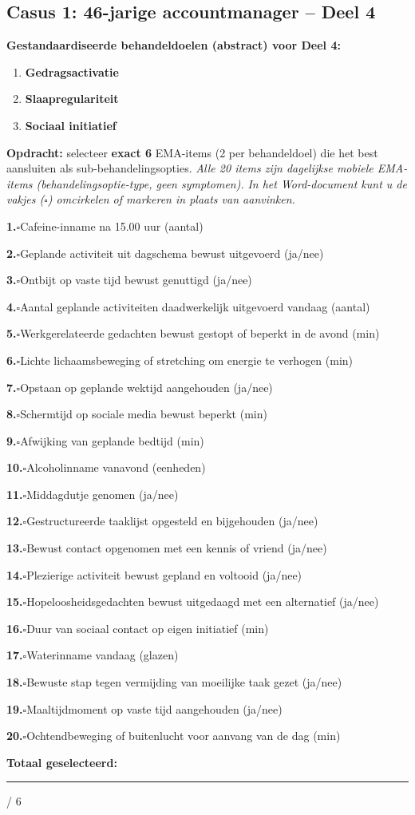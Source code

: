 \documentclass[11pt,a4paper]{article}
\newcommand{\checkitemBFS}[2]{%
\noindent\small\textbf{#1.}\hspace{0.45em}$\square$\hspace{0.4em}#2\par\vspace{0.20em}}
\begin{document}
\newpage
\subsection*{Casus 1: 46-jarige accountmanager -- Deel 4}

\begin{contextbox}
\small\textbf{Gestandaardiseerde behandeldoelen (abstract) voor Deel 4:}
\begin{enumerate}[topsep=2pt,itemsep=1pt,label=\arabic*.]
\item \textbf{Gedragsactivatie}
\item \textbf{Slaapregulariteit}
\item \textbf{Sociaal initiatief}
\end{enumerate}
\end{contextbox}

\begin{responsebox}
\small\textbf{Opdracht:} selecteer \textbf{exact 6} EMA-items (2 per behandeldoel) die het best aansluiten als sub-behandelingsopties.
\textit{Alle 20 items zijn dagelijkse mobiele EMA-items (behandelingsoptie-type, geen symptomen).}
\textit{In het Word-document kunt u de vakjes ($\square$) omcirkelen of markeren in plaats van aanvinken.}

\checkitemBFS{1}{Cafeine-inname na 15.00 uur (aantal)}
\checkitemBFS{2}{Geplande activiteit uit dagschema bewust uitgevoerd (ja/nee)}
\checkitemBFS{3}{Ontbijt op vaste tijd bewust genuttigd (ja/nee)}
\checkitemBFS{4}{Aantal geplande activiteiten daadwerkelijk uitgevoerd vandaag (aantal)}
\checkitemBFS{5}{Werkgerelateerde gedachten bewust gestopt of beperkt in de avond (min)}
\checkitemBFS{6}{Lichte lichaamsbeweging of stretching om energie te verhogen (min)}
\checkitemBFS{7}{Opstaan op geplande wektijd aangehouden (ja/nee)}
\checkitemBFS{8}{Schermtijd op sociale media bewust beperkt (min)}
\checkitemBFS{9}{Afwijking van geplande bedtijd (min)}
\checkitemBFS{10}{Alcoholinname vanavond (eenheden)}
\checkitemBFS{11}{Middagdutje genomen (ja/nee)}
\checkitemBFS{12}{Gestructureerde taaklijst opgesteld en bijgehouden (ja/nee)}
\checkitemBFS{13}{Bewust contact opgenomen met een kennis of vriend (ja/nee)}
\checkitemBFS{14}{Plezierige activiteit bewust gepland en voltooid (ja/nee)}
\checkitemBFS{15}{Hopeloosheidsgedachten bewust uitgedaagd met een alternatief (ja/nee)}
\checkitemBFS{16}{Duur van sociaal contact op eigen initiatief (min)}
\checkitemBFS{17}{Waterinname vandaag (glazen)}
\checkitemBFS{18}{Bewuste stap tegen vermijding van moeilijke taak gezet (ja/nee)}
\checkitemBFS{19}{Maaltijdmoment op vaste tijd aangehouden (ja/nee)}
\checkitemBFS{20}{Ochtendbeweging of buitenlucht voor aanvang van de dag (min)}
\vspace{0.4em}
\noindent\textbf{Totaal geselecteerd:}\hspace{0.5em}\rule{1.2cm}{0.25pt}\hspace{0.2em}/ 6
\end{responsebox}
\end{document}
